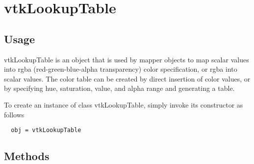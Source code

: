 \section{vtkLookupTable}

\subsection{Usage}

 vtkLookupTable is an object that is used by mapper objects to map scalar 
 values into rgba (red-green-blue-alpha transparency) color specification, 
 or rgba into scalar values. The color table can be created by direct 
 insertion of color values, or by specifying  hue, saturation, value, and 
 alpha range and generating a table.


To create an instance of class vtkLookupTable, simply
invoke its constructor as follows
\begin{verbatim}
  obj = vtkLookupTable
\end{verbatim}
\subsection{Methods}

